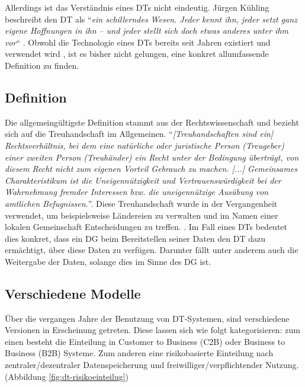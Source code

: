 \documentclass[
	fontsize=11pt,
	headings=small,
	parskip=half,           %
	bibliography=totoc,
	numbers=noenddot,       %
	open=any,               %
]{scrreprt}
\begin{document}
Allerdings ist das Verständnis eines DTs nicht eindeutig. Jürgen Kühling beschreibt den DT als ``\textit{ein schillerndes Wesen. Jeder kennt ihn, jeder setzt ganz eigene Hoffnungen in ihn – und jeder stellt sich doch etwas anderes unter ihm vor}`` \cite{dt-kuhling2021datentreuhander}. Obwohl die Technologie eines DTs bereits seit Jahren existiert und verwendet wird \cite{dt-hardinges2018data}, ist es bisher nicht gelungen, eine konkret allumfassende Definition zu finden.

\subsection{Definition}
Die allgemeingültigste Definition stammt aus der Rechtswissenschaft und bezieht sich auf die Treuhandschaft im Allgemeinen. ``\textit{[Treuhandschaften sind ein] Rechtsverhältnis, bei dem eine natürliche oder juristische Person (Treugeber) einer zweiten Person (Treuhänder) ein Recht unter der Bedingung überträgt, von diesem Recht nicht zum eigenen Vorteil Gebrauch zu machen. [...] Gemeinsames Charakteristikum ist die Uneigennützigkeit und Vertrauenswürdigkeit bei der Wahrnehmung fremder Interessen bzw. die uneigennützige Ausübung von amtlichen Befugnissen.}''\cite{dt-beeck2013treuhandschaft}. Diese Treuhandschaft wurde in der Vergangenheit verwendet, um beispielsweise Ländereien zu verwalten und im Namen einer lokalen Gemeinschaft Entscheidungen zu treffen. \cite{dt-hardinges2018data}. Im Fall eines DTs bedeutet dies konkret, dass ein DG beim Bereitstellen seiner Daten den DT dazu ermächtigt, über diese Daten zu verfügen. Darunter fällt unter anderem auch die Weitergabe der Daten, solange dies im Sinne des DG ist. 

\subsection{Verschiedene Modelle}
Über die vergangen Jahre der Benutzung von DT-Systemen, sind verschiedene Versionen in Erscheinung getreten. Diese lassen sich wie folgt kategorisieren: zum einen besteht die Einteilung in Customer to Business (C2B) oder Business to Business (B2B) Systeme. Zum anderen eine risikobasierte Einteilung nach zentraler/dezentraler Datenspeicherung und freiwilliger/verpflichtender Nutzung. (Abbildung \ref{fig:dt-risikoeinteilug})
\end{document}
